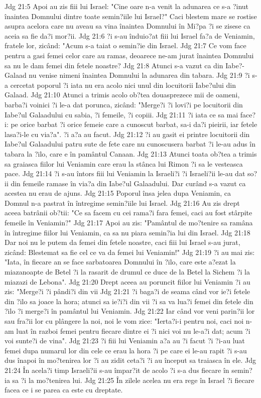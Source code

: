 Jdg 21:5  Apoi au zis fiii lui Israel: "Cine oare n-a venit la adunarea ce s-a ?inut înaintea Domnului dintre toate semin?iile lui Israel?" Caci blestem mare se rostise asupra acelora care nu aveau sa vina înaintea Domnului în Mi?pa ?i se zisese ca aceia sa fie da?i mor?ii.
Jdg 21:6  ?i s-au înduio?at fiii lui Israel fa?a de Veniamin, fratele lor, zicând: "Acum s-a taiat o semin?ie din Israel.
Jdg 21:7  Ce vom face pentru a gasi femei celor care au ramas, deoarece ne-am jurat înaintea Domnului sa nu le dam femei din fetele noastre?
Jdg 21:8  Atunci s-a vazut ca din Iabe?-Galaad nu venise nimeni înaintea Domnului la adunarea din tabara.
Jdg 21:9  ?i s-a cercetat poporul ?i iata nu era acolo nici unul din locuitorii Iabe?ului din Galaad.
Jdg 21:10  Atunci a trimis acolo ob?tea douasprezece mii de oameni, barba?i voinici ?i le-a dat porunca, zicând: "Merge?i ?i lovi?i pe locuitorii din Iabe?ul Galaadului cu sabia, ?i femeile, ?i copiii.
Jdg 21:11  ?i iata ce sa mai face?i: pe orice barbat ?i orice femeie care a cunoscut barbat, sa-i da?i pieirii, iar fetele lasa?i-le cu via?a". ?i a?a au facut.
Jdg 21:12  ?i au gasit ei printre locuitorii din Iabe?ul Galaadului patru sute de fete care nu cunoscusera barbat ?i le-au adus în tabara la ?ilo, care e în pamântul Canaan.
Jdg 21:13  Atunci toata ob?tea a trimis sa graiasca fiilor lui Veniamin care erau la stânca lui Rimon ?i sa le vesteasca pace.
Jdg 21:14  ?i s-au întors fiii lui Veniamin la Israeli?i ?i Israeli?ii le-au dat so?ii din femeile ramase în via?a din Iabe?ul Galaadului. Dar curând s-a vazut ca acestea nu erau de ajuns.
Jdg 21:15  Poporul însa jelea dupa Veniamin, ca Domnul n-a pastrat în întregime semin?iile lui Israel.
Jdg 21:16  Au zis drept aceea batrânii ob?tii: "Ce sa facem cu cei rama?i fara femei, caci au fost stârpite femeile în Veniamin?"
Jdg 21:17  Apoi au zis: "Pamântul de mo?tenire sa ramâna în întregime fiilor lui Veniamin, ca sa nu piara semin?ia lui din Israel.
Jdg 21:18  Dar noi nu le putem da femei din fetele noastre, caci fiii lui Israel s-au jurat, zicând: Blestemat sa fie cel ce va da femei lui Veniamin!"
Jdg 21:19  ?i au mai zis: "Iata, în fiecare an se face sarbatoarea Domnului în ?ilo, care este a?ezat la miazanoapte de Betel ?i la rasarit de drumul ce duce de la Betel la Sichem ?i la miazazi de Lebona".
Jdg 21:20  Drept aceea au poruncit fiilor lui Veniamin ?i au zis: "Merge?i ?i pândi?i din vii
Jdg 21:21  ?i baga?i de seama când vor ie?i fetele din ?ilo sa joace la hora; atunci sa ie?i?i din vii ?i sa va lua?i femei din fetele din ?ilo ?i merge?i în pamântul lui Veniamin.
Jdg 21:22  Iar când vor veni parin?ii lor sau fra?ii lor cu plângere la noi, noi le vom zice: "Ierta?i-i pentru noi, caci noi n-am luat în razboi femei pentru fiecare dintre ei ?i nici voi nu le-a?i dat; acum ?i voi sunte?i de vina".
Jdg 21:23  ?i fiii lui Veniamin a?a au ?i facut ?i ?i-au luat femei dupa numarul lor din cele ce erau la hora ?i pe care ei le-au rapit ?i s-au dus înapoi în mo?tenirea lor ?i au zidit ceta?i ?i au început sa traiasca în ele.
Jdg 21:24  În acela?i timp Israeli?ii s-au împar?it de acolo ?i s-a dus fiecare în semin?ia sa ?i la mo?tenirea lui.
Jdg 21:25  În zilele acelea nu era rege în Israel ?i fiecare facea ce i se parea ca este cu dreptate.


